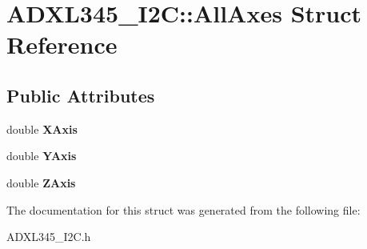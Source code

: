 \hypertarget{structADXL345__I2C_1_1AllAxes}{
\section{ADXL345\_\-I2C::AllAxes Struct Reference}
\label{structADXL345__I2C_1_1AllAxes}
}
\subsection*{Public Attributes}
\begin{DoxyCompactItemize}
\item 
\hypertarget{structADXL345__I2C_1_1AllAxes_a924ade14b130a5a544182c239c515d8f}{
double {\bfseries XAxis}}
\label{structADXL345__I2C_1_1AllAxes_a924ade14b130a5a544182c239c515d8f}

\item 
\hypertarget{structADXL345__I2C_1_1AllAxes_a649604b9e35d13969b6e3f5b9a3cf914}{
double {\bfseries YAxis}}
\label{structADXL345__I2C_1_1AllAxes_a649604b9e35d13969b6e3f5b9a3cf914}

\item 
\hypertarget{structADXL345__I2C_1_1AllAxes_ae8bdb3b8573e5edaf25ebae1b9cf89af}{
double {\bfseries ZAxis}}
\label{structADXL345__I2C_1_1AllAxes_ae8bdb3b8573e5edaf25ebae1b9cf89af}

\end{DoxyCompactItemize}


The documentation for this struct was generated from the following file:\begin{DoxyCompactItemize}
\item 
ADXL345\_\-I2C.h\end{DoxyCompactItemize}
